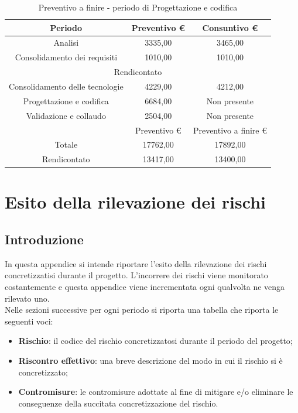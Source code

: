 \documentclass[./PianodiProgetto.tex]{subfiles}
\begin{document}
\begin{table}[H]
	\centering
	\begin{tabular}{|c|c|c|}
		\hline
		Periodo&Preventivo \euro{}&Consuntivo \euro{} \\ \hline
		Analisi&3335,00&3465,00  \\ \hline
		Consolidamento dei requisiti&1010,00&1010,00  \\ \hline
		\multicolumn{3}{|c|}{Rendicontato}  \\ \hline
		Consolidamento delle tecnologie&4229,00&4212,00  \\ \hline
		Progettazione e codifica&6684,00&Non presente  \\ \hline
		Validazione e collaudo&2504,00&Non presente  \\ \hline
		&Preventivo \euro{}&Preventivo a finire \euro{}  \\ \hline
		Totale&17762,00&17892,00 \\ \hline
		Rendicontato&13417,00&13400,00 \\ \hline
	\end{tabular}
	\caption{Preventivo a finire - periodo di Progettazione e codifica}
\end{table}


\appendix


\appendix

\chapter{Esito della rilevazione dei rischi}

\section{Introduzione}

In questa appendice si intende riportare l'esito della rilevazione dei rischi concretizzatisi durante il progetto. L'incorrere dei rischi viene monitorato costantemente e questa appendice viene incrementata ogni qualvolta ne venga rilevato uno. \\
Nelle sezioni successive per ogni periodo si riporta una tabella che riporta le seguenti voci:

\begin{itemize}
	\item \textbf{Rischio}: il codice del rischio concretizzatosi durante il periodo del progetto;
	\item \textbf{Riscontro effettivo}: una breve descrizione del modo in cui il rischio si è concretizzato;
	\item \textbf{Contromisure}: le contromisure adottate al fine di mitigare e/o eliminare le conseguenze della succitata concretizzazione del rischio.
\end{itemize}
\end{document}
